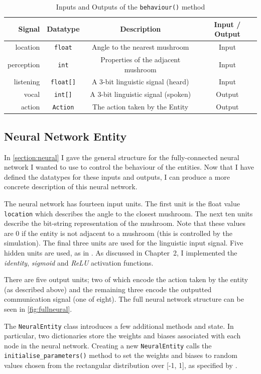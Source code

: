 \documentclass[12pt,a4paper]{report}
\begin{document}
\begin{table}[t]
\centering
 \begin{tabular}{ r | c | c | c}
 \bf{Signal} & \bf{Datatype} & \bf{Description} & \bf{Input / Output} \\ [0.5ex] 
 \hline
location & \texttt{float} & Angle to the nearest mushroom & Input \\
perception & \texttt{int} & Properties of the adjacent mushroom & Input \\
listening & \texttt{float[]} & A 3-bit linguistic signal (heard) & Input \\
vocal & \texttt{int[]} & A 3-bit linguistic signal (spoken) & Output \\
action & \texttt{Action} & The action taken by the Entity & Output \\
\end{tabular}
\caption{Inputs and Outputs of the \texttt{behaviour()} method}
\label{table:behaviour}
\end{table}

\subsection{Neural Network Entity}

In \cref{section:neural} I gave the general structure for the fully-connected neural network I wanted to use to control the behaviour of the entities. Now that I have defined the datatypes for these inputs and outputs, I can produce a more concrete description of this neural network.

The neural network has fourteen input units. The first unit is the float value \texttt{location} which describes the angle to the closest mushroom. The next ten units describe the bit-string representation of the mushroom. Note that these values are 0 if the entity is not adjacent to a mushroom (this is controlled by the simulation). The final three units are used for the linguistic input signal. Five hidden units are used, as in \citet{Cangelosi1998}. As discussed in Chapter~2, I implemented the \emph{identity}, \emph{sigmoid} and \emph{ReLU} activation functions.

There are five output units; two of which encode the action taken by the entity (as described above) and the remaining three encode the outputted communication signal (one of eight). The full neural network structure can be seen in \cref{fig:fullneural}.

The \texttt{NeuralEntity} class introduces a few additional methods and state. In particular, two dictionaries store the weights and biases associated with each node in the neural network. Creating a new \texttt{NeuralEntity} calls the \texttt{initialise\_parameters()} method to set the weights and biases to random values chosen from the rectangular distribution over [-1, 1], as specified by \citet{Cangelosi1998}.
\end{document}
